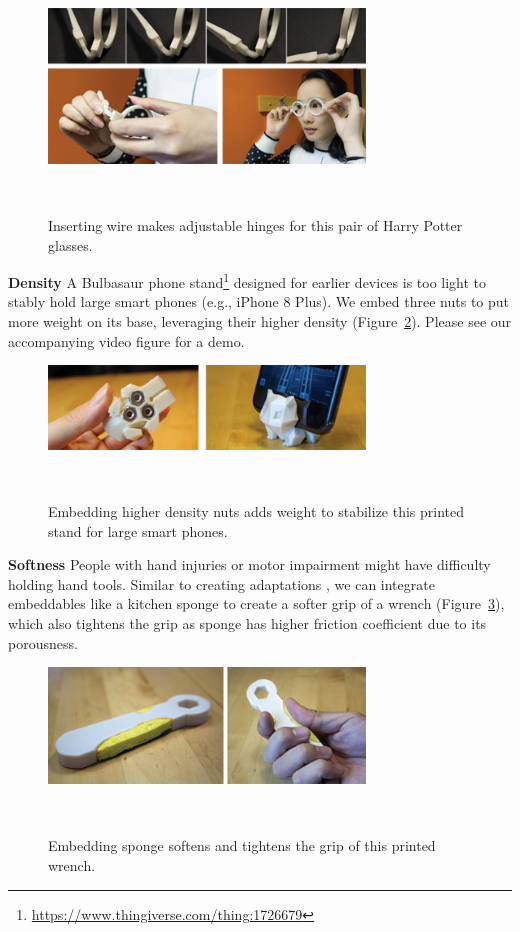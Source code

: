 
\begin{figure} [h]
  \centering
  \includegraphics[width=0.75\textwidth]{figures/glasses}
  \caption{Inserting wire makes adjustable hinges for this pair of Harry Potter glasses.}~\label{fig:glasses}
\end{figure}

\textbf{Density} A Bulbasaur phone stand\footnote{\url{https://www.thingiverse.com/thing:1726679}} designed for earlier devices is too light to stably hold large smart phones (e.g., iPhone 8 Plus). We embed three nuts to put more weight on its base, leveraging their higher density (Figure~\ref{fig:phone_stand}). Please see our accompanying video figure for a demo.

\begin{figure} [h]
  \centering
  \includegraphics[width=0.75\textwidth]{figures/phone_stand}
  \caption{Embedding higher density nuts adds weight to stabilize this printed stand for large smart phones.}~\label{fig:phone_stand}
\end{figure}

\textbf{Softness} People with hand injuries or motor impairment might have difficulty holding hand tools. Similar to creating adaptations \cite{chen2016reprise}, we can integrate embeddables like a kitchen sponge to create a softer grip of a wrench (Figure~\ref{fig:wrench}), which also tightens the grip as sponge has higher friction coefficient due to its porousness.

\begin{figure} [h!]
  \centering
  \includegraphics[width=0.75\textwidth]{figures/wrench}
  \caption{Embedding sponge softens and tightens the grip of this printed wrench.}~\label{fig:wrench}
\end{figure}

